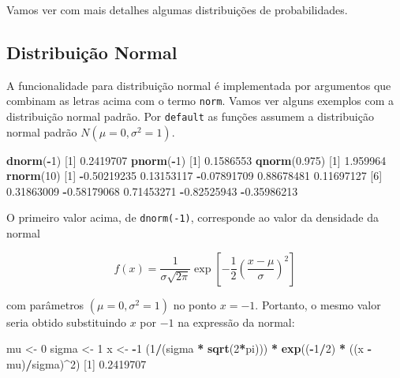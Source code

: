 \documentclass[10pt,a4paper]{book}
\newenvironment{Shaded}{\begin{snugshade}}{\end{snugshade}}
\newcommand{\KeywordTok}[1]{\textcolor[rgb]{0.13,0.29,0.53}{\textbf{#1}}}
\newcommand{\DecValTok}[1]{\textcolor[rgb]{0.00,0.00,0.81}{#1}}
\newcommand{\FloatTok}[1]{\textcolor[rgb]{0.00,0.00,0.81}{#1}}
\newcommand{\StringTok}[1]{\textcolor[rgb]{0.31,0.60,0.02}{#1}}
\newcommand{\OperatorTok}[1]{\textcolor[rgb]{0.81,0.36,0.00}{\textbf{#1}}}
\newcommand{\NormalTok}[1]{#1}
\begin{document}
Vamos ver com mais detalhes algumas distribuições de probabilidades.

\subsection{Distribuição Normal}\label{distribuicao-normal}

A funcionalidade para distribuição normal é implementada por argumentos
que combinam as letras acima com o termo \texttt{norm}. Vamos ver alguns
exemplos com a distribuição normal padrão. Por \texttt{default} as
funções assumem a distribuição normal padrão \(N(\mu=0, \sigma^2=1)\).

\begin{Shaded}
\begin{Highlighting}[]
\KeywordTok{dnorm}\NormalTok{(}\OperatorTok{-}\DecValTok{1}\NormalTok{)}
\NormalTok{[}\DecValTok{1}\NormalTok{] }\FloatTok{0.2419707}
\KeywordTok{pnorm}\NormalTok{(}\OperatorTok{-}\DecValTok{1}\NormalTok{)}
\NormalTok{[}\DecValTok{1}\NormalTok{] }\FloatTok{0.1586553}
\KeywordTok{qnorm}\NormalTok{(}\FloatTok{0.975}\NormalTok{)}
\NormalTok{[}\DecValTok{1}\NormalTok{] }\FloatTok{1.959964}
\KeywordTok{rnorm}\NormalTok{(}\DecValTok{10}\NormalTok{)}
\NormalTok{ [}\DecValTok{1}\NormalTok{] }\OperatorTok{-}\FloatTok{0.50219235}  \FloatTok{0.13153117} \OperatorTok{-}\FloatTok{0.07891709}  \FloatTok{0.88678481}  \FloatTok{0.11697127}
\NormalTok{ [}\DecValTok{6}\NormalTok{]  }\FloatTok{0.31863009} \OperatorTok{-}\FloatTok{0.58179068}  \FloatTok{0.71453271} \OperatorTok{-}\FloatTok{0.82525943} \OperatorTok{-}\FloatTok{0.35986213}
\end{Highlighting}
\end{Shaded}

O primeiro valor acima, de \texttt{dnorm(-1)}, corresponde ao valor da
densidade da normal

\[
f(x) = \frac{1}{\sigma\sqrt{2 \pi}}\exp \left[ -\frac{1}{2}
    \left( \frac{x - \mu}{\sigma} \right)^2 \right]
\]

com parâmetros \((\mu=0, \sigma^2=1)\) no ponto \(x = -1\). Portanto, o
mesmo valor seria obtido substituindo \(x\) por \(-1\) na expressão da
normal:

\begin{Shaded}
\begin{Highlighting}[]
\NormalTok{mu <-}\StringTok{ }\DecValTok{0}
\NormalTok{sigma <-}\StringTok{ }\DecValTok{1}
\NormalTok{x <-}\StringTok{ }\OperatorTok{-}\DecValTok{1}
\NormalTok{(}\DecValTok{1}\OperatorTok{/}\NormalTok{(sigma }\OperatorTok{*}\StringTok{ }\KeywordTok{sqrt}\NormalTok{(}\DecValTok{2}\OperatorTok{*}\NormalTok{pi))) }\OperatorTok{*}\StringTok{ }\KeywordTok{exp}\NormalTok{((}\OperatorTok{-}\DecValTok{1}\OperatorTok{/}\DecValTok{2}\NormalTok{) }\OperatorTok{*}\StringTok{ }\NormalTok{((x }\OperatorTok{-}\StringTok{ }\NormalTok{mu)}\OperatorTok{/}\NormalTok{sigma)}\OperatorTok{^}\DecValTok{2}\NormalTok{)}
\NormalTok{[}\DecValTok{1}\NormalTok{] }\FloatTok{0.2419707}
\end{Highlighting}
\end{Shaded}
\end{document}
